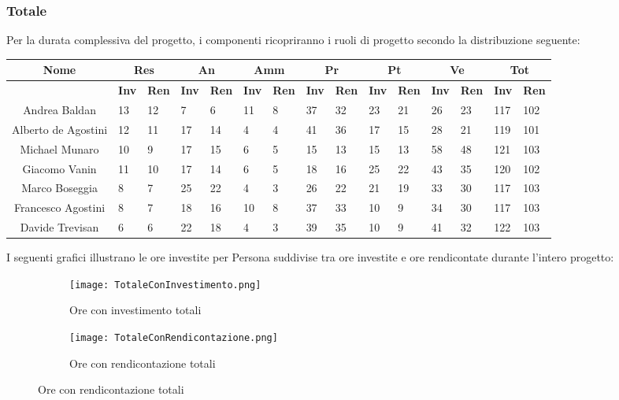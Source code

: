 \documentclass{scalatekids-article}
\begin{document}
\subsubsection{Totale}
Per la durata complessiva del progetto, i componenti ricopriranno i ruoli di progetto secondo la distribuzione seguente:
\begin{center}
  \scriptsize
  \begin{tabular}{| c | p{0.35cm}  p{0.35cm} | p{0.35cm}  p{0.35cm} | p{0.35cm}  p{0.35cm} | p{0.35cm}  p{0.35cm} | p{0.35cm}  p{0.35cm} | p{0.35cm}  p{0.35cm} | p{0.35cm}  p{0.35cm} |}
    \hline
    \textbf{Nome} & \multicolumn{2}{|c|}{\textbf{Res}} & \multicolumn{2}{|c|}{\textbf{An}} & \multicolumn{2}{|c|}{\textbf{Amm}} & \multicolumn{2}{|c|}{\textbf{Pr}} & \multicolumn{2}{|c|}{\textbf{Pt}} & \multicolumn{2}{|c|}{\textbf{Ve}} & \multicolumn{2}{|c|}{\textbf{Tot}}\\
    \hline
    & \textbf{Inv} & \textbf{Ren} & \textbf{Inv} & \textbf{Ren} & \textbf{Inv} & \textbf{Ren} & \textbf{Inv} & \textbf{Ren} & \textbf{Inv} & \textbf{Ren} & \textbf{Inv} & \textbf{Ren} & \textbf{Inv} & \textbf{Ren}\\
    \hline
    Andrea Baldan & 13 & 12 & 7 & 6 & 11 & 8 & 37 & 32 & 23 & 21 & 26 & 23 & 117 & 102\\
    Alberto de Agostini & 12 & 11 & 17 & 14 & 4 & 4 & 41 & 36 & 17 & 15 & 28 & 21 & 119 & 101\\
    Michael Munaro & 10 & 9 & 17 & 15 & 6 & 5 & 15 & 13 & 15 & 13 & 58 & 48 & 121 & 103\\
    Giacomo Vanin & 11 & 10 & 17 & 14 & 6 & 5 & 18 & 16 & 25 & 22 & 43 & 35 & 120 & 102\\
    Marco Boseggia & 8 & 7 & 25 & 22 & 4 & 3 & 26 & 22 & 21 & 19 & 33 & 30 & 117 & 103\\
    Francesco Agostini & 8 & 7 & 18 & 16 & 10 & 8 & 37 & 33 & 10 & 9 & 34 & 30 & 117 & 103\\
    Davide Trevisan & 6 & 6 & 22 & 18 & 4 & 3 & 39 & 35 & 10 & 9 & 41 & 32 & 122 & 103\\
    \hline
  \end{tabular}
\end{center}
\normalsize
I seguenti grafici illustrano le ore investite per Persona suddivise tra ore investite e ore rendicontate durante l'intero progetto:
\begin{figure}[H]
  \begin{subfigure}[H]{0.47\textwidth}
    \texttt{[image: TotaleConInvestimento.png]}
    \caption{Ore con investimento totali}
  \end{subfigure}
  \qquad
  \begin{subfigure}[H]{0.47\textwidth}
    \texttt{[image: TotaleConRendicontazione.png]}
    \caption{Ore con rendicontazione totali}
  \end{subfigure}
\end{figure}
\newpage
\end{document}
